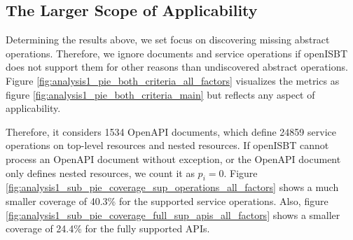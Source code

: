 \subsection{The Larger Scope of Applicability}
\label{sec:analysis1:larger_context_of_applicability}
Determining the results above, we set focus on discovering missing abstract operations. Therefore, we ignore documents and service operations if openISBT does not support them for other reasons than undiscovered abstract operations. Figure \ref{fig:analysis1_pie_both_criteria_all_factors} visualizes the metrics as figure \ref{fig:analysis1_pie_both_criteria_main} but reflects any aspect of applicability.



Therefore, it considers 1534 OpenAPI documents, which define 24859 service operations on top-level resources and nested resources.
If openISBT cannot process an OpenAPI document without exception, or the OpenAPI document only defines nested resources, we count it as $p_i=0$. Figure  \ref{fig:analysis1_sub_pie_coverage_sup_operations_all_factors} shows a  much smaller coverage of 40.3\% for the supported service operations.
Also, figure \ref{fig:analysis1_sub_pie_coverage_full_sup_apis_all_factors} shows a smaller coverage of 24.4\% for the fully supported APIs. 
